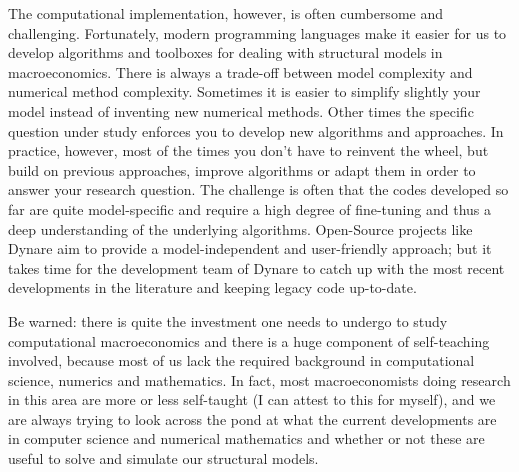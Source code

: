 The computational implementation, however, is often cumbersome and challenging.
Fortunately, modern programming languages make it easier for us to develop algorithms
  and toolboxes for dealing with structural models in macroeconomics.
There is always a trade-off between model complexity and numerical method complexity.
Sometimes it is easier to simplify slightly your model instead of inventing new numerical methods.
Other times the specific question under study enforces you to develop new algorithms and approaches.
In practice, however, most of the times you don't have to reinvent the wheel,
  but build on previous approaches, improve algorithms or adapt them in order to answer your research question.
The challenge is often that the codes developed so far are quite model-specific
  and require a high degree of fine-tuning and thus a deep understanding of the underlying algorithms.
Open-Source projects like Dynare aim to provide a model-independent and user-friendly approach;
  but it takes time for the development team of Dynare to catch up with the most recent developments in the literature
  and keeping legacy code up-to-date.

Be warned: there is quite the investment one needs to undergo to study computational macroeconomics
  and there is a huge component of self-teaching involved,
  because most of us lack the required background in computational science, numerics and mathematics.
In fact, most macroeconomists doing research in this area are more or less self-taught (I can attest to this for myself),
  and we are always trying to look across the pond at what the current developments are in computer science and numerical mathematics
  and whether or not these are useful to solve and simulate our structural models.